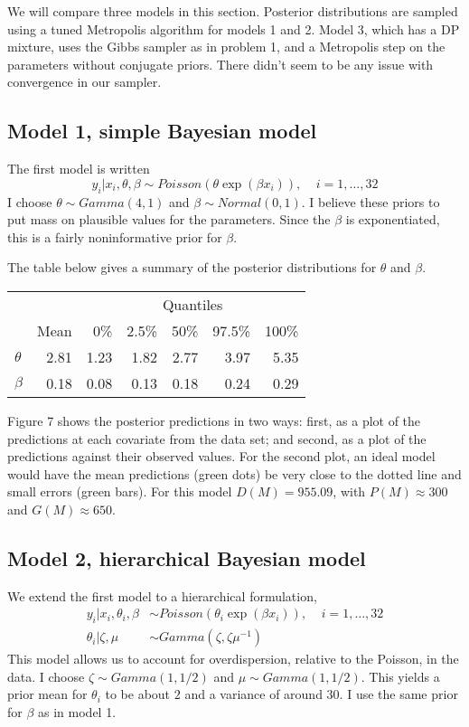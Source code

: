 \documentclass[12pt]{article}
\begin{document}
We will compare three models in this section. Posterior distributions are sampled using a tuned Metropolis algorithm for models 1 and 2. Model 3, which has a DP mixture, uses the Gibbs sampler as in problem 1, and a Metropolis step on the parameters without conjugate priors. There didn't seem to be any issue with convergence in our sampler.

\subsection*{Model 1, simple Bayesian model}

The first model is written
\[ y_i|x_i,\theta,\beta \sim Poisson(\theta\exp(\beta x_i)), ~~~~~ i=1,\ldots,32 \]
I choose $\theta \sim Gamma(4, 1)$ and $\beta \sim Normal(0, 1)$. I believe these priors to put mass on plausible values for the parameters. Since the $\beta$ is exponentiated, this is a fairly noninformative prior for $\beta$.

The table below gives a summary of the posterior distributions for $\theta$ and $\beta$.

\begin{center}
\begin{tabular}{lrrrrrr}
         &      & \multicolumn{5}{c}{Quantiles} \\
         & Mean & \multicolumn{1}{|r}{0\%}  & 2.5\% & 50\% & 97.5\% & 100\% \\ \hline\hline
$\theta$ & 2.81 &  1.23 & 1.82  & 2.77 &  3.97  & 5.35  \\
$\beta$  & 0.18 &  0.08 & 0.13  & 0.18 &  0.24  & 0.29  \\ \hline
\end{tabular}
\end{center}

Figure 7 shows the posterior predictions in two ways: first, as a plot of the predictions at each covariate from the data set; and second, as a plot of the predictions against their observed values. For the second plot, an ideal model would have the mean predictions (green dots) be very close to the dotted line and small errors (green bars). For this model $D(M)=955.09$, with $P(M)\approx 300$ and $G(M)\approx 650$.

\subsection*{Model 2, hierarchical Bayesian model}

We extend the first model to a hierarchical formulation,
\begin{align*}
y_i|x_i,\theta_i,\beta &\sim Poisson(\theta_i\exp(\beta x_i)), ~~~~~ i=1,\ldots,32 \\
\theta_i|\zeta, \mu &\sim Gamma(\zeta, \zeta\mu^{-1}) 
\end{align*}
This model allows us to account for overdispersion, relative to the Poisson, in the data. I choose $\zeta \sim Gamma(1, 1/2)$ and $\mu\sim Gamma(1, 1/2)$. This yields a prior mean for $\theta_i$ to be about $2$ and a variance of around $30$. I use the same prior for $\beta$ as in model 1.
\end{document}
